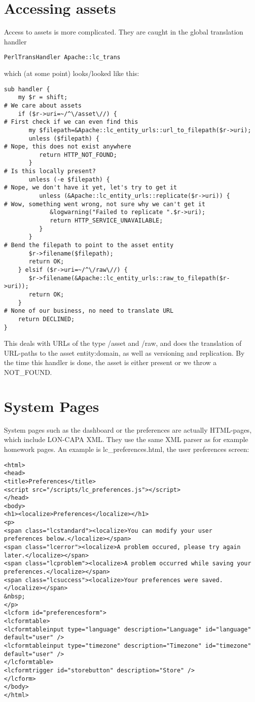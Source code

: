 \section{Accessing assets}
Access to assets is more complicated. They are caught in the global translation handler
\begin{verbatim}
PerlTransHandler Apache::lc_trans
\end{verbatim}
which (at some point) looks/looked like this:
\begin{verbatim}
sub handler {
    my $r = shift;
# We care about assets
    if ($r->uri=~/^\/asset\//) {
# First check if we can even find this
       my $filepath=&Apache::lc_entity_urls::url_to_filepath($r->uri);
       unless ($filepath) {
# Nope, this does not exist anywhere
          return HTTP_NOT_FOUND;
       }
# Is this locally present?
       unless (-e $filepath) {
# Nope, we don't have it yet, let's try to get it
          unless (&Apache::lc_entity_urls::replicate($r->uri)) {
# Wow, something went wrong, not sure why we can't get it
             &logwarning("Failed to replicate ".$r->uri);
             return HTTP_SERVICE_UNAVAILABLE; 
          }
       }
# Bend the filepath to point to the asset entity
       $r->filename($filepath);
       return OK;
    } elsif ($r->uri=~/^\/raw\//) {
       $r->filename(&Apache::lc_entity_urls::raw_to_filepath($r->uri));
       return OK;
    } 
# None of our business, no need to translate URL
    return DECLINED; 
}
\end{verbatim}
This deals with URLs of the type /asset and /raw, and does the translation of URL-paths to the asset entity:domain, as well as versioning and replication. By the time this handler is done, the asset is either present or we throw a NOT\_FOUND.
\section{System Pages}
System pages such as the dashboard or the preferences are actually HTML-pages, which include LON-CAPA XML. They use the same XML parser as for example homework pages. An example is lc\_preferences.html, the user preferences screen:
\begin{verbatim}
<html>
<head>
<title>Preferences</title>
<script src="/scripts/lc_preferences.js"></script>
</head>
<body>
<h1><localize>Preferences</localize></h1>
<p>
<span class="lcstandard"><localize>You can modify your user preferences below.</localize></span>
<span class="lcerror"><localize>A problem occured, please try again later.</localize></span>
<span class="lcproblem"><localize>A problem occurred while saving your preferences.</localize></span>
<span class="lcsuccess"><localize>Your preferences were saved.</localize></span>
&nbsp;
</p>
<lcform id="preferencesform">
<lcformtable>
<lcformtableinput type="language" description="Language" id="language" default="user" />
<lcformtableinput type="timezone" description="Timezone" id="timezone" default="user" />
</lcformtable>
<lcformtrigger id="storebutton" description="Store" />
</lcform>
</body>
</html>
\end{verbatim}
